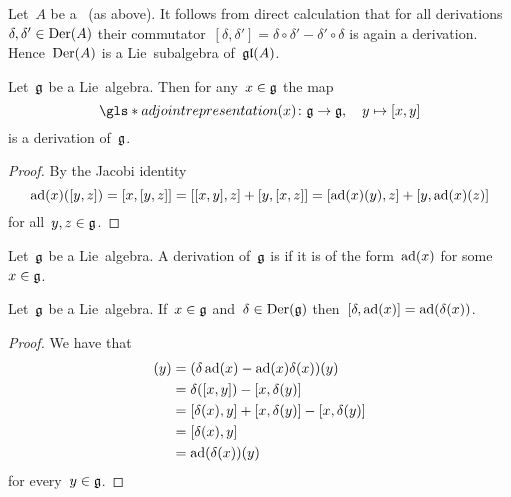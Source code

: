 \begin{example}
  Let~$A$ be a~{\algebra{$\kf$}} (as above).
  It follows from direct calculation that for all derivations~$\delta, \delta' \in \operatorname{Der}(A)$ their commutator~$[\delta, \delta'] = \delta \circ \delta' - \delta' \circ \delta$ is again a derivation.
  Hence~$\operatorname{Der}(A)$ is a Lie~subalgebra of~$\mathfrak{gl}(A)$.
\end{example}


\begin{lemma}
\label{lie algebras act adjoint by derivations}
  Let~$\mathfrak{g}$ be a Lie~algebra.
  Then for any~$x \in \mathfrak{g}$ the map
  \[
    \gls*{adjoint representation}(x)
    \colon
    \glie
    \to
    \glie,
    \quad
    y
    \mapsto
    [x,y]
  \]
  is a derivation of~$\mathfrak{g}$.
\end{lemma}


\begin{proof}
  By the Jacobi identity
  \[
    \operatorname{ad}(x)([y,z])
    =
    [x,[y,z]]
    =
    [[x,y],z] + [y,[x,z]] \\
    =
    [\operatorname{ad}(x)(y), z] + [y, \operatorname{ad}(x)(z)]
  \]
  for all~$y,z \in \mathfrak{g}$.
\end{proof}


\begin{definition}
 Let~$\mathfrak{g}$ be a Lie~algebra.
 A derivation of~$\mathfrak{g}$ is  if it is of the form~$\operatorname{ad}(x)$ for some~$x \in \mathfrak{g}$.
\end{definition}


\begin{lemma}
  \label{commutator of any derivation and inner derivation}
  Let~$\mathfrak{g}$ be a Lie~algebra.
  If~$x \in \mathfrak{g}$ and~$\delta \in \operatorname{Der}(\mathfrak{g})$ then~$[\delta, \operatorname{ad}(x)] = \operatorname{ad}(\delta(x))$.
\end{lemma}


\begin{proof}
 We have that
 \begin{align*}
  [\delta, \ad(x)](y)
  &= 
  (\delta \ad(x) - \ad(x) \delta(x))(y)
  \\
  &=
  \delta([x,y]) - [x,\delta(y)]
  \\
  &=
  [\delta(x),y] + [x,\delta(y)] - [x,\delta(y)]
  \\
  &=
  [\delta(x),y]
  \\
  &=
  \ad(\delta(x))(y)
 \end{align*}
 for every~$y \in \mathfrak{g}$.
\end{proof}


